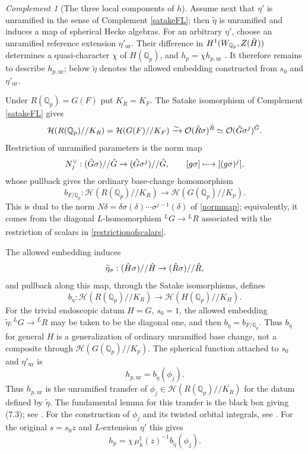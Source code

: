 \documentclass[11pt,a4paper]{article}
\theoremstyle{definition}
\theoremstyle{plain}
\theoremstyle{remark}
\newtheorem{Rc}[shared]{Complement}
\theoremstyle{plain}
\begin{document}
\begin{Rc}[The three local components of $h$]
    Assume next that $\eta'$ is unramified in the sense of Complement \ref{satakeFL}; then $\widetilde{\eta}$ is unramified and induces a map of spherical Hecke algebras. For an arbitrary $\eta'$, choose an unramified reference extension $\eta'_{\mathrm{ur}}$. Their difference in $H^1(W_{\mathbb{Q}_p},Z(\Hat{H}))$ determines a quasi-character $\chi$ of $H(\mathbb{Q}_p)$, and $h_p=\chi h_{p,\mathrm{ur}}$ \cite[p.~181]{MR1044820}. It therefore remains to describe $h_{p,\mathrm{ur}}$; below $\widetilde{\eta}$ denotes the allowed embedding constructed from $s_0$ and $\eta'_{\mathrm{ur}}$.

    Under $R(\mathbb{Q}_p)=G(F)$ put $K_R=K_F$. The Satake isomorphism of Complement \ref{satakeFL} gives
    $$\mathcal{H}(R(\mathbb{Q}_p)//K_R)=\mathcal{H}(G(F)//K_F)\xrightarrow{\sim}\mathcal{O}(\Hat{R}\sigma)^{\Hat{R}}\simeq\mathcal{O}(\Hat{G}\sigma^j)^{\Hat{G}}.$$
    Restriction of unramified parameters is the norm map
    $$N_j^{\vee}:(\Hat{G}\sigma)//\Hat{G}\xrightarrow[]{}(\Hat{G}\sigma^j)//\Hat{G}, \qquad [g\sigma]\longmapsto[(g\sigma)^j],$$
    whose pullback gives the ordinary base-change homomorphism
    $$b_{F/\mathbb{Q}_p}:\mathcal{H}(R(\mathbb{Q}_p)//K_R)\xrightarrow[]{}\mathcal{H}(G(\mathbb{Q}_p)//K_p).$$
    This is dual to the norm $N\delta=\delta\sigma(\delta)\cdots\sigma^{j-1}(\delta)$ of \ref{normmap}; equivalently, it comes from the diagonal $L$-homomorphism ${}^L G\xrightarrow[]{}{}^L R$ associated with the restriction of scalars in \ref{restrictionofscalars}.

    The allowed embedding induces
    $$\widetilde{\eta}_{\sigma}:(\Hat{H}\sigma)//\Hat{H}\xrightarrow[]{}(\Hat{R}\sigma)//\Hat{R},$$
    and pullback along this map, through the Satake isomorphisms, defines
    $$b_{\widetilde{\eta}}:\mathcal{H}(R(\mathbb{Q}_p)//K_R)\xrightarrow[]{}\mathcal{H}(H(\mathbb{Q}_p)//K_H).$$
    For the trivial endoscopic datum $H=G$, $s_0=1$, the allowed embedding $\widetilde{\eta}:{}^L G\xrightarrow[]{}{}^L R$ may be taken to be the diagonal one, and then $b_{\widetilde{\eta}}=b_{F/\mathbb{Q}_p}$. Thus $b_{\widetilde{\eta}}$ for general $H$ is a generalization of ordinary unramified base change, not a composite through $\mathcal{H}(G(\mathbb{Q}_p)//K_p)$. The spherical function attached to $s_0$ and $\eta'_{\mathrm{ur}}$ is
    $$h_{p,\mathrm{ur}}=b_{\widetilde{\eta}}(\phi_j).$$
    Thus $h_{p,\mathrm{ur}}$ is the unramified transfer of $\phi_j\in\mathcal{H}(R(\mathbb{Q}_p)//K_R)$ for the datum defined by $\widetilde{\eta}$. The fundamental lemma for this transfer is the black box giving (7.3); see \cite[\S\S 7.4.12--7.4.18]{kisin2021stabletraceformulashimura}. For the construction of $\phi_j$ and its twisted orbital integrals, see \cite{MR761308}. For the original $s=s_0z$ and $L$-extension $\eta'$ this gives
    $$h_p=\chi\,\mu_h^{\natural}(z)^{-1}b_{\widetilde{\eta}}(\phi_j).$$


\end{Rc}
\end{document}
